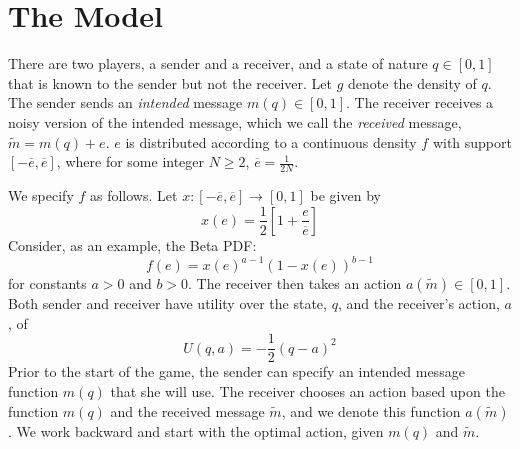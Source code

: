 \documentclass[12pt]{article}
\begin{document}
\onehalfspacing


\tableofcontents
\section{The Model}

There are two players, a sender and a receiver, and a state of nature $q\in [ 0,1]$ that is known to the sender but not the receiver. Let $g$ denote the density of $q$. The sender sends an \textit{intended} message $m(q)\in [ 0,1]$. The receiver receives a noisy version of the intended message, which we call the \textit{received} message, $\widetilde{m} =m(q)+e$. $e$ is distributed according to a continuous density $ f$ with support $[-\overline{e },\overline{e }]$, where for some integer $N\geq2$, $\overline{e}=\frac{1}{2N}$. 

We specify $f$ as follows. Let $x:[-\overline{e},\overline{e}]\rightarrow[0,1]$ be given by
\begin{equation}
	x(e)=\frac{1}{2}\left[1+\frac{e}{\overline{e}}\right]
\end{equation}
Consider, as an example, the Beta PDF:
\begin{equation}
	f(e)=x(e)^{a-1}(1-x(e))^{b-1}
\end{equation}
for constants $a>0$ and $b>0$. The receiver then takes an action $a(\widetilde{m})\in[0,1]$. Both sender and receiver have utility over the state, $q$, and the receiver's action, $a$, of 
\begin{equation}
	U(q,a)=-\frac{1}{2}(q-a)^{2}
\end{equation}
Prior to the start of the game, the sender can specify an intended message function $m(q)$ that she will use. The receiver chooses an action based upon the function $m(q)$ and the received message $\widetilde{m}$, and we denote this function $a(\widetilde{m})$. We work backward and start with the optimal action, given $m(q)$ and $\widetilde{m}$.
\end{document}
